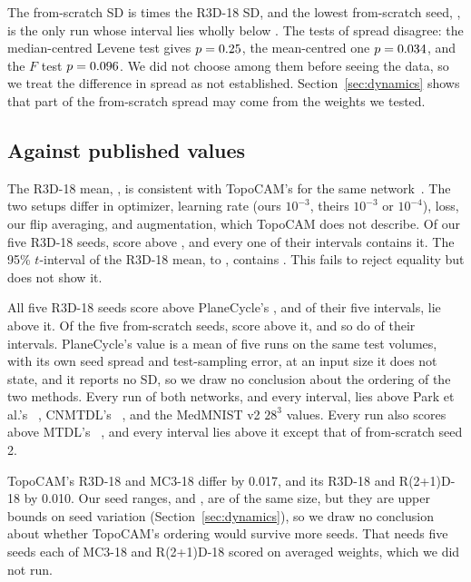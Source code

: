 \documentclass[conference]{IEEEtran}
\newif\ifanycitation
\let\citeAnyKey\cite
\renewcommand{\cite}{\global\anycitationtrue\citeAnyKey}
\begin{document}
The from-scratch SD is \sdRatio{} times the R3D-18 SD, and the lowest from-scratch seed,
\AurocScratchTwo{}, is the only run whose interval lies wholly below \baseTopoAuroc{}.
The tests of spread disagree: the median-centred Levene test gives $p=0.25{}$, the
mean-centred one $p=0.034{}$, and the $F$ test $p=0.096{}$. We did not choose among
them before seeing the data, so we treat the difference in spread as not established.
Section~\ref{sec:dynamics} shows that part of the from-scratch spread may come from the
weights we tested.

\subsection{Against published values}
\label{sec:published}

The R3D-18 mean, \meanAurocKinetics{}, is consistent with TopoCAM's \baseTopoAuroc{} for
the same network~\cite{nuwagira2026topocam}. The two setups differ in optimizer, learning
rate (ours $10^{-3}$, theirs $10^{-3}$ or $10^{-4}$), loss, our flip averaging, and
augmentation, which TopoCAM does not describe. Of our five R3D-18 seeds, \aboveTopoKinetics{} score above \baseTopoAuroc{}, and
every one of their intervals contains it. The 95\% $t$-interval of the R3D-18 mean, \tLoKinetics{} to \tHiKinetics{}, contains
\baseTopoAuroc{}. This fails to reject equality but does not show it.

All five R3D-18 seeds score above PlaneCycle's \basePlaneAuroc{}, and of their five
intervals, \ciAbovePlaneKinetics{} lie above it. Of the five from-scratch seeds,
\abovePlaneScratch{} score above it, and so do \ciAbovePlaneScratch{} of their intervals.
PlaneCycle's value is a mean of five runs on the same test volumes, with its own seed spread
and test-sampling error, at an input size it does not state, and it reports no SD, so we
draw no conclusion about the ordering
of the two methods. Every run of both networks, and every interval, lies above Park et
al.'s \baseParkAuroc{}~\cite{park2026axial}, CNMTDL's
\baseCnmtdlAuroc{}~\cite{wachira2026combinatorial}, and the MedMNIST v2 $28^3$ values. Every
run also scores above MTDL's \baseMtdlAuroc{}~\cite{liu2026manifold}, and every interval
lies above it except that of from-scratch seed 2.

TopoCAM's R3D-18 and MC3-18 differ by 0.017, and its R3D-18 and R(2+1)D-18 by 0.010. Our
seed ranges, \rangeAurocScratch{} and \rangeAurocKinetics{}, are of the same size, but they
are upper bounds on seed variation (Section~\ref{sec:dynamics}), so we draw no conclusion
about whether TopoCAM's ordering would survive more seeds. That needs five seeds each of
MC3-18 and R(2+1)D-18 scored on averaged weights, which we did not run.
\end{document}
